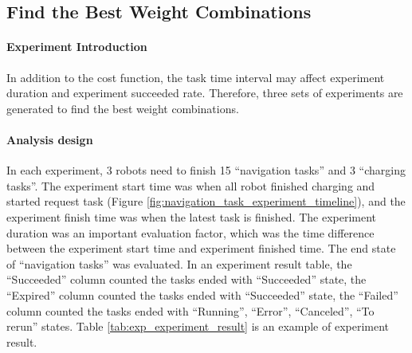 \subsection{ Find the Best Weight Combinations}
\paragraph{Experiment Introduction}
In addition to the cost function, the task time interval may affect experiment duration and experiment succeeded rate. Therefore, three sets of experiments are generated to find the best weight combinations. 
 

\paragraph{Analysis design}
In each experiment, 3 robots need to finish 15 ``navigation tasks'' and 3 ``charging tasks''.
The experiment start time was when all robot finished charging and started request task (Figure \ref{fig:navigation_task_experiment_timeline}), and the experiment finish time was when the latest task is finished.
The experiment duration was an important evaluation factor, which was the time difference between the experiment start time and experiment finished time. 
The end state of ``navigation tasks'' was evaluated. In an experiment result table, the ``Succeeded'' column counted the tasks ended with ``Succeeded'' state, the ``Expired'' column counted the tasks ended with ``Succeeded'' state, the ``Failed'' column counted the tasks ended with ``Running'', ``Error'', ``Canceled'', ``To rerun'' states. 
Table \ref{tab:exp_experiment_result} is an example of experiment result. 

